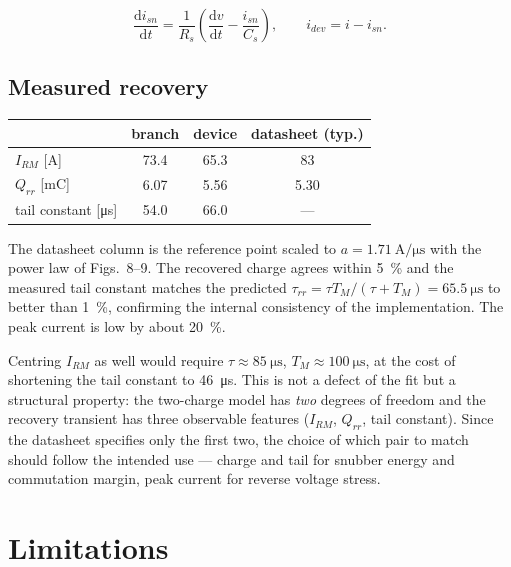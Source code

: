 \documentclass[11pt,a4paper]{article}
\begin{document}
\begin{equation}
  \frac{\mathrm{d}i_{sn}}{\mathrm{d}t}
  = \frac{1}{R_s}\left(\frac{\mathrm{d}v}{\mathrm{d}t} - \frac{i_{sn}}{C_s}\right),
  \qquad i_{dev} = i - i_{sn}.
\end{equation}

\subsection{Measured recovery}

\begin{center}
\begin{tabular}{lccc}
\toprule
 & branch & device & datasheet (typ.) \\
\midrule
$I_{RM}$ [\si{\ampere}]        & 73.4  & 65.3  & 83   \\
$Q_{rr}$ [\si{\milli\coulomb}] & 6.07  & 5.56  & 5.30 \\
tail constant [\si{\micro\second}] & 54.0 & 66.0 & --- \\
\bottomrule
\end{tabular}
\end{center}

The datasheet column is the reference point scaled to
$a = \SI{1.71}{\ampere\per\micro\second}$ with the power law of Figs.~8--9.
The recovered charge agrees within \SI{5}{\percent} and the measured tail
constant matches the predicted
$\tau_{rr} = \tau T_M/(\tau + T_M) = \SI{65.5}{\micro\second}$ to better than
\SI{1}{\percent}, confirming the internal consistency of the implementation.
The peak current is low by about \SI{20}{\percent}.

Centring $I_{RM}$ as well would require $\tau \approx \SI{85}{\micro\second}$,
$T_M \approx \SI{100}{\micro\second}$, at the cost of shortening the tail
constant to \SI{46}{\micro\second}. This is not a defect of the fit but a
structural property: the two-charge model has \emph{two} degrees of freedom
and the recovery transient has three observable features ($I_{RM}$, $Q_{rr}$,
tail constant). Since the datasheet specifies only the first two, the choice
of which pair to match should follow the intended use --- charge and tail for
snubber energy and commutation margin, peak current for reverse voltage
stress.

\section{Limitations}
\end{document}
